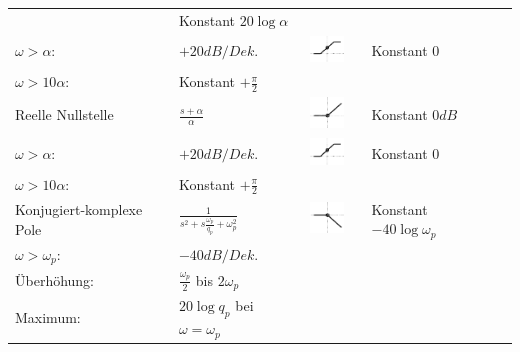 \begin{landscape}
\begin{longtable}{|l|l|ll|ll|}
\begin{tabular}{ll}
			$\omega < \alpha$: & Konstant $20 \log \alpha$ \\
			$\omega > \alpha$: & $+20dB/Dek.$
		\end{tabular} & 
		\parbox[c][1cm]{1cm}{\includegraphics[width=1cm]{./bilder/bode-approx-phase-5.png}}	&
		\begin{tabular}{ll}
			$\omega < \frac{\alpha}{10}$: & Konstant $0$ \\
			$\omega > 10 \alpha$: & Konstant $+\frac{\pi}{2}$
		\end{tabular}
	\\ \hline	
		Reelle Nullstelle &
		$\frac{s + \alpha}{\alpha}$ &
		\parbox[c][1cm]{1cm}{\includegraphics[width=1cm]{./bilder/bode-approx-ampl-5.png}} &
		\begin{tabular}{ll}
			$\omega < \alpha$: & Konstant $0dB$ \\
			$\omega > \alpha$: & $+20dB/Dek.$
		\end{tabular} &
		\parbox[c][1cm]{1cm}{\includegraphics[width=1cm]{./bilder/bode-approx-phase-5.png}} &
		\begin{tabular}{ll}
			$\omega < \frac{\alpha}{10}$: & Konstant $0$ \\
			$\omega > 10 \alpha$: & Konstant $+\frac{\pi}{2}$
		\end{tabular}
	\\ \hline
		Konjugiert-komplexe Pole &
		$\frac{1}{s^2+s\frac{\omega_p}{q_p}+\omega_p^2}$ &
		\parbox[c][1cm]{1cm}{\includegraphics[width=1cm]{./bilder/bode-approx-ampl-6.png}} &
		\begin{tabular}{ll}
			$\omega < \omega_p$: 	& Konstant $-40 \log \omega_p$ \\
			$\omega > \omega_p$:	& $-40dB/Dek.$ \\
			Überhöhung: 			& $\frac{\omega_p}{2}$ bis $2\omega_p$ \\
			Maximum:				& $20 \log q_p$ bei $\omega = \omega_p$			
		\end{tabular} &

\end{longtable}
\end{landscape}

